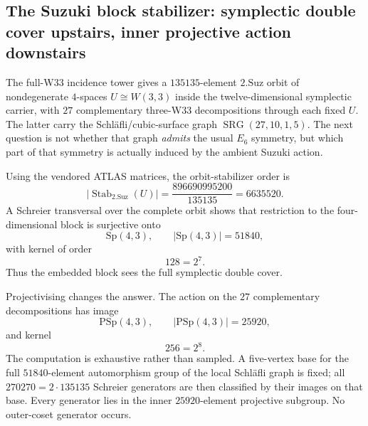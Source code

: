 \subsection{The Suzuki block stabilizer: symplectic double cover upstairs, inner projective action downstairs}
\label{sec:20260917-suzuki-w33-stabilizer-quotient}

The full-W33 incidence tower gives a $135135$-element $2.\mathrm{Suz}$ orbit of
nondegenerate $4$-spaces $U\cong W(3,3)$ inside the twelve-dimensional
symplectic carrier, with $27$ complementary three-W33 decompositions through
each fixed $U$.  The latter carry the Schläfli/cubic-surface graph
$\operatorname{SRG}(27,10,1,5)$.  The next question is not whether that graph
\emph{admits} the usual $E_6$ symmetry, but which part of that symmetry is
actually induced by the ambient Suzuki action.

Using the vendored ATLAS matrices, the orbit-stabilizer order is
\[
 |\operatorname{Stab}_{2.\mathrm{Suz}}(U)|
 =\frac{896690995200}{135135}
 =\boxed{6635520}.
\]
A Schreier transversal over the complete orbit shows that restriction to the
four-dimensional block is surjective onto
\[
 \boxed{\mathrm{Sp}(4,3)},\qquad |\mathrm{Sp}(4,3)|=51840,
\]
with kernel of order
\[
 \boxed{128=2^7}.
\]
Thus the embedded block sees the full symplectic double cover.

Projectivising changes the answer.  The action on the $27$ complementary
decompositions has image
\[
 \boxed{\mathrm{PSp}(4,3)},\qquad |\mathrm{PSp}(4,3)|=25920,
\]
and kernel
\[
 \boxed{256=2^8}.
\]
The computation is exhaustive rather than sampled.  A five-vertex base for the
full $51840$-element automorphism group of the local Schläfli graph is fixed;
all $270270=2\cdot135135$ Schreier generators are then classified by their
images on that base.  Every generator lies in the inner $25920$-element
projective subgroup.  No outer-coset generator occurs.

\begin{center}
\end{center}

